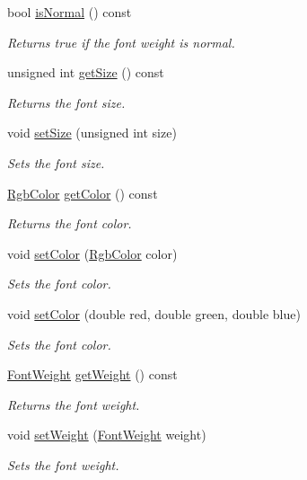 \begin{CompactItemize}
bool \hyperlink{class_style_db2cbc7ca50b2f5c632c8e9b0420044c}{isNormal} () const 
\begin{CompactList}\small\item\em Returns true if the font weight is normal. \item\end{CompactList}\item 
unsigned int \hyperlink{class_style_9356c4a5d30f4e0f5c86f8c8b3f36cd2}{getSize} () const 
\begin{CompactList}\small\item\em Returns the font size. \item\end{CompactList}\item 
void \hyperlink{class_style_1338ebe3d562a710fdc26f49d0082a7c}{setSize} (unsigned int size)
\begin{CompactList}\small\item\em Sets the font size. \item\end{CompactList}\item 
\hyperlink{struct_rgb_color}{RgbColor} \hyperlink{class_style_bd212fb31bc7e1e7502c18f9e0b6734c}{getColor} () const 
\begin{CompactList}\small\item\em Returns the font color. \item\end{CompactList}\item 
void \hyperlink{class_style_596534e321ac5c2f4444192f2cc0d793}{setColor} (\hyperlink{struct_rgb_color}{RgbColor} color)
\begin{CompactList}\small\item\em Sets the font color. \item\end{CompactList}\item 
void \hyperlink{class_style_8162fb5c89458b1892f1802231a63a16}{setColor} (double red, double green, double blue)
\begin{CompactList}\small\item\em Sets the font color. \item\end{CompactList}\item 
\hyperlink{_font_weight_8h_ecff23ba4a68486421bcea57e095fe66}{FontWeight} \hyperlink{class_style_5798e7a57bb2df5e37aa0cdc5606a8b3}{getWeight} () const 
\begin{CompactList}\small\item\em Returns the font weight. \item\end{CompactList}\item 
void \hyperlink{class_style_3bb5ced743176c5a68479d506f348350}{setWeight} (\hyperlink{_font_weight_8h_ecff23ba4a68486421bcea57e095fe66}{FontWeight} weight)
\begin{CompactList}\small\item\em Sets the font weight. \item\end{CompactList}\end{CompactItemize}
